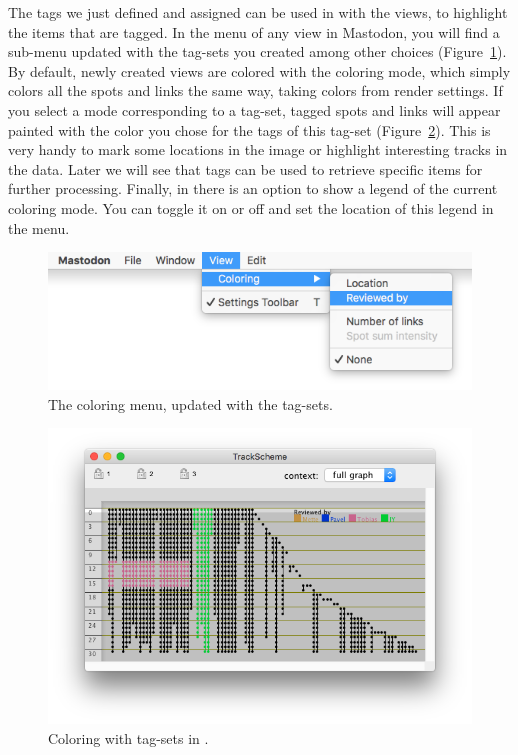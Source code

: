 The tags we just defined and assigned can be used in with the views, to highlight the items that are tagged. 
In the  menu of any view in Mastodon, you will find a sub-menu updated with the tag-sets you created among other choices (Figure~\ref{fig:ColorByTagSetMenu}). 
By default, newly created views are colored with the  coloring mode, which simply colors all the spots and links the same way, taking colors from render settings. 
If you select a mode corresponding to a tag-set, tagged spots and links will appear painted with the color you chose for the tags of this tag-set (Figure~\ref{fig:ColorByTagSetTrackScheme}).
This is very handy to mark some locations in the image or highlight interesting tracks in the data.
Later we will see that tags can be used to retrieve specific items for further processing.
Finally, in \TrackScheme there is an option to show a legend of the current coloring mode.
You can toggle it on or off and set the location of this legend in the  menu.

\begin{figure}
    \centering
    \includegraphics[height=0.1\textheight]{figures/Mastodon_ColorByTagSet_4.png}
    
    \caption{The coloring menu, updated with the tag-sets. }
    \label{fig:ColorByTagSetMenu}
\end{figure}

\begin{figure}
    \centering
    \includegraphics[height=0.25\textheight]{figures/Mastodon_ColorByTagSet_5.png}
    
    \caption{Coloring with tag-sets in \TrackScheme. }
    \label{fig:ColorByTagSetTrackScheme}
\end{figure}


